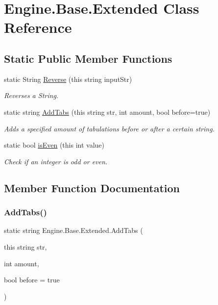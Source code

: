 \hypertarget{class_engine_1_1_base_1_1_extended}{}\section{Engine.\+Base.\+Extended Class Reference}
\label{class_engine_1_1_base_1_1_extended}
\subsection*{Static Public Member Functions}
\begin{DoxyCompactItemize}
\item 
static String \mbox{\hyperlink{class_engine_1_1_base_1_1_extended_a0af0964cb1c28ffcaa909c409ab0dc60}{Reverse}} (this string input\+Str)
\begin{DoxyCompactList}\small\item\em Reverses a String. \end{DoxyCompactList}\item 
static string \mbox{\hyperlink{class_engine_1_1_base_1_1_extended_aa05b264127b5b7e28229505dd330cd37}{Add\+Tabs}} (this string str, int amount, bool before=true)
\begin{DoxyCompactList}\small\item\em Adds a specified amount of tabulations before or after a certain string. \end{DoxyCompactList}\item 
static bool \mbox{\hyperlink{class_engine_1_1_base_1_1_extended_a9fce13474f60048b7e7fc2e0a9e706c5}{is\+Even}} (this int value)
\begin{DoxyCompactList}\small\item\em Check if an integer is odd or even. \end{DoxyCompactList}\end{DoxyCompactItemize}


\subsection{Member Function Documentation}
\mbox{\label{class_engine_1_1_base_1_1_extended_aa05b264127b5b7e28229505dd330cd37}} 
\subsubsection{\texorpdfstring{AddTabs()}{AddTabs()}}
{\footnotesize\ttfamily static string Engine.\+Base.\+Extended.\+Add\+Tabs (\begin{DoxyParamCaption}\item[{this string}]{str,  }\item[{int}]{amount,  }\item[{bool}]{before = {\ttfamily true} }\end{DoxyParamCaption})\hspace{0.3cm}{\ttfamily [static]}}



